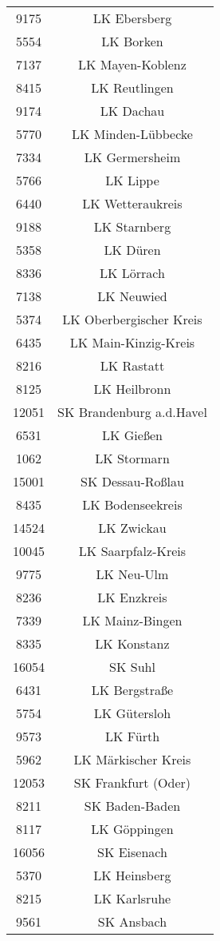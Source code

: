 \begin{tabular}{c c}
    9175&LK Ebersberg\\ 
    5554&LK Borken\\ 
    7137&LK Mayen-Koblenz\\ 
    8415&LK Reutlingen\\ 
    9174&LK Dachau\\ 
    5770&LK Minden-Lübbecke\\ 
    7334&LK Germersheim\\ 
    5766&LK Lippe\\ 
    6440&LK Wetteraukreis\\ 
    9188&LK Starnberg\\ 
    5358&LK Düren\\ 
    8336&LK Lörrach\\ 
    7138&LK Neuwied\\ 
    5374&LK Oberbergischer Kreis\\ 
    6435&LK Main-Kinzig-Kreis\\ 
    8216&LK Rastatt\\ 
    8125&LK Heilbronn\\ 
    12051&SK Brandenburg a.d.Havel\\ 
    6531&LK Gießen\\ 
    1062&LK Stormarn\\ 
    15001&SK Dessau-Roßlau\\ 
    8435&LK Bodenseekreis\\ 
    14524&LK Zwickau\\ 
    10045&LK Saarpfalz-Kreis\\ 
    9775&LK Neu-Ulm\\ 
    8236&LK Enzkreis\\ 
    7339&LK Mainz-Bingen\\ 
    8335&LK Konstanz\\ 
    16054&SK Suhl\\ 
    6431&LK Bergstraße\\ 
    5754&LK Gütersloh\\ 
    9573&LK Fürth\\ 
    5962&LK Märkischer Kreis\\ 
    12053&SK Frankfurt (Oder)\\ 
    8211&SK Baden-Baden\\ 
    8117&LK Göppingen\\ 
    16056&SK Eisenach\\ 
    5370&LK Heinsberg\\ 
    8215&LK Karlsruhe\\ 
    9561&SK Ansbach\\ 

\end{tabular}
